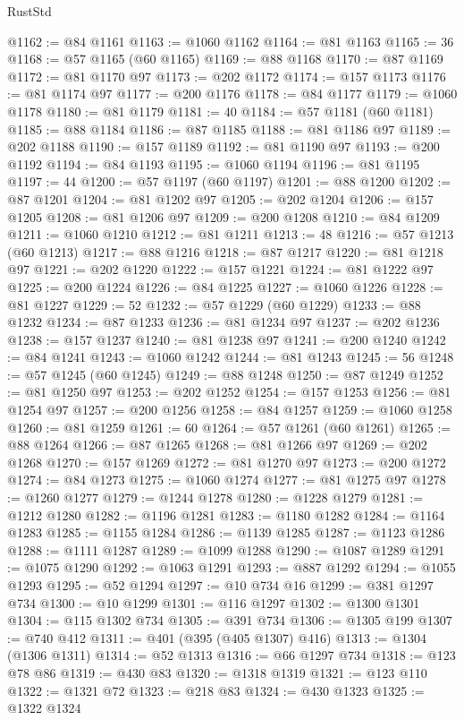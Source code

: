 \begin{lexlean}{RustStd}
\begin{coremodule}
@1162 := @84 @1161
@1163 := @1060 @1162
@1164 := @81 @1163
@1165 := 36
@1168 := @57 @1165 (@60 @1165)
@1169 := @88 @1168
@1170 := @87 @1169
@1172 := @81 @1170 @97
@1173 := @202 @1172
@1174 := @157 @1173
@1176 := @81 @1174 @97
@1177 := @200 @1176
@1178 := @84 @1177
@1179 := @1060 @1178
@1180 := @81 @1179
@1181 := 40
@1184 := @57 @1181 (@60 @1181)
@1185 := @88 @1184
@1186 := @87 @1185
@1188 := @81 @1186 @97
@1189 := @202 @1188
@1190 := @157 @1189
@1192 := @81 @1190 @97
@1193 := @200 @1192
@1194 := @84 @1193
@1195 := @1060 @1194
@1196 := @81 @1195
@1197 := 44
@1200 := @57 @1197 (@60 @1197)
@1201 := @88 @1200
@1202 := @87 @1201
@1204 := @81 @1202 @97
@1205 := @202 @1204
@1206 := @157 @1205
@1208 := @81 @1206 @97
@1209 := @200 @1208
@1210 := @84 @1209
@1211 := @1060 @1210
@1212 := @81 @1211
@1213 := 48
@1216 := @57 @1213 (@60 @1213)
@1217 := @88 @1216
@1218 := @87 @1217
@1220 := @81 @1218 @97
@1221 := @202 @1220
@1222 := @157 @1221
@1224 := @81 @1222 @97
@1225 := @200 @1224
@1226 := @84 @1225
@1227 := @1060 @1226
@1228 := @81 @1227
@1229 := 52
@1232 := @57 @1229 (@60 @1229)
@1233 := @88 @1232
@1234 := @87 @1233
@1236 := @81 @1234 @97
@1237 := @202 @1236
@1238 := @157 @1237
@1240 := @81 @1238 @97
@1241 := @200 @1240
@1242 := @84 @1241
@1243 := @1060 @1242
@1244 := @81 @1243
@1245 := 56
@1248 := @57 @1245 (@60 @1245)
@1249 := @88 @1248
@1250 := @87 @1249
@1252 := @81 @1250 @97
@1253 := @202 @1252
@1254 := @157 @1253
@1256 := @81 @1254 @97
@1257 := @200 @1256
@1258 := @84 @1257
@1259 := @1060 @1258
@1260 := @81 @1259
@1261 := 60
@1264 := @57 @1261 (@60 @1261)
@1265 := @88 @1264
@1266 := @87 @1265
@1268 := @81 @1266 @97
@1269 := @202 @1268
@1270 := @157 @1269
@1272 := @81 @1270 @97
@1273 := @200 @1272
@1274 := @84 @1273
@1275 := @1060 @1274
@1277 := @81 @1275 @97
@1278 := @1260 @1277
@1279 := @1244 @1278
@1280 := @1228 @1279
@1281 := @1212 @1280
@1282 := @1196 @1281
@1283 := @1180 @1282
@1284 := @1164 @1283
@1285 := @1155 @1284
@1286 := @1139 @1285
@1287 := @1123 @1286
@1288 := @1111 @1287
@1289 := @1099 @1288
@1290 := @1087 @1289
@1291 := @1075 @1290
@1292 := @1063 @1291
@1293 := @887 @1292
@1294 := @1055 @1293
@1295 := @52 @1294
@1297 := @10 @734 @16
@1299 := @381 @1297 @734
@1300 := @10 @1299
@1301 := @116 @1297
@1302 := @1300 @1301
@1304 := @115 @1302 @734
@1305 := @391 @734
@1306 := @1305 @199
@1307 := @740 @412
@1311 := @401 (@395 (@405 @1307) @416)
@1313 := @1304 (@1306 @1311)
@1314 := @52 @1313
@1316 := @66 @1297 @734
@1318 := @123 @78 @86
@1319 := @430 @83
@1320 := @1318 @1319
@1321 := @123 @110
@1322 := @1321 @72
@1323 := @218 @83
@1324 := @430 @1323
@1325 := @1322 @1324

\end{coremodule}
\end{lexlean}
